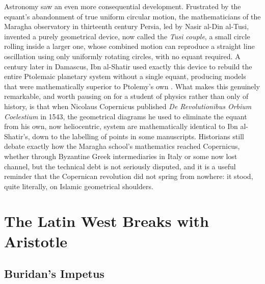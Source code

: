     Astronomy saw an even more consequential development. Frustrated by the equant's abandonment of true uniform circular motion, the mathematicians of the Maragha observatory in thirteenth century Persia, led by Nasir al-Din al-Tusi, invented a purely geometrical device, now called the \textit{Tusi couple}, a small circle rolling inside a larger one, whose combined motion can reproduce a straight line oscillation using only uniformly rotating circles, with no equant required. A century later in Damascus, Ibn al-Shatir used exactly this device to rebuild the entire Ptolemaic planetary system without a single equant, producing models that were mathematically superior to Ptolemy's own \citep{saliba1987}. What makes this genuinely remarkable, and worth pausing on for a student of physics rather than only of history, is that when Nicolaus Copernicus published \textit{De Revolutionibus Orbium Coelestium} in 1543, the geometrical diagrams he used to eliminate the equant from his own, now heliocentric, system are mathematically identical to Ibn al-Shatir's, down to the labelling of points in some manuscripts. Historians still debate exactly how the Maragha school's mathematics reached Copernicus, whether through Byzantine Greek intermediaries in Italy or some now lost channel, but the technical debt is not seriously disputed, and it is a useful reminder that the Copernican revolution did not spring from nowhere: it stood, quite literally, on Islamic geometrical shoulders.

\section{The Latin West Breaks with Aristotle}

    \subsection{Buridan's Impetus}

